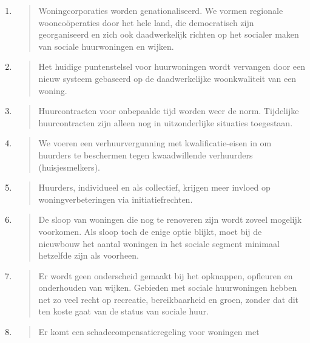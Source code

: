 \begin{enumerate}
\def\labelenumi{\arabic{enumi}.}
\item
  \begin{quote}
  Woningcorporaties worden genationaliseerd. We vormen regionale
  wooncoöperaties door het hele land, die democratisch zijn
  georganiseerd en zich ook daadwerkelijk richten op het socialer maken
  van sociale huurwoningen en wijken.
  \end{quote}
\item
  \begin{quote}
  Het huidige puntenstelsel voor huurwoningen wordt vervangen door een
  nieuw systeem gebaseerd op de daadwerkelijke woonkwaliteit van een
  woning.
  \end{quote}
\item
  \begin{quote}
  Huurcontracten voor onbepaalde tijd worden weer de norm. Tijdelijke
  huurcontracten zijn alleen nog in uitzonderlijke situaties toegestaan.
  \end{quote}
\item
  \begin{quote}
  We voeren een verhuurvergunning met kwalificatie-eisen in om huurders
  te beschermen tegen kwaadwillende verhuurders (huisjesmelkers).
  \end{quote}
\item
  \begin{quote}
  Huurders, individueel en als collectief, krijgen meer invloed op
  woningverbeteringen via initiatiefrechten.
  \end{quote}
\item
  \begin{quote}
  De sloop van woningen die nog te renoveren zijn wordt zoveel mogelijk
  voorkomen. Als sloop toch de enige optie blijkt, moet bij de nieuwbouw
  het aantal woningen in het sociale segment minimaal hetzelfde zijn als
  voorheen.
  \end{quote}
\item
  \begin{quote}
  Er wordt geen onderscheid gemaakt bij het opknappen, opfleuren en
  onderhouden van wijken. Gebieden met sociale huurwoningen hebben net
  zo veel recht op recreatie, bereikbaarheid en groen, zonder dat dit
  ten koste gaat van de status van sociale huur.
  \end{quote}
\item
  \begin{quote}
  Er komt een schadecompensatieregeling voor woningen met

\end{quote}
\end{enumerate}
